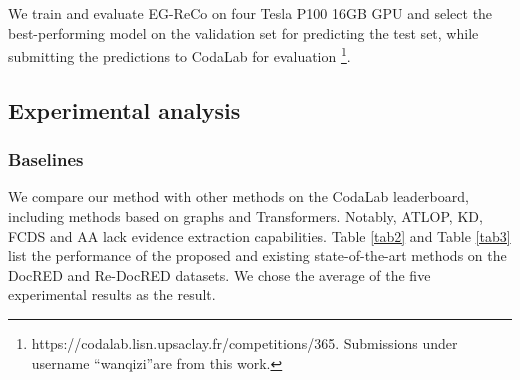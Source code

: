 \documentclass[preprint,12pt]{elsarticle}
\begin{document}
We train and evaluate EG-ReCo on four Tesla P100 16GB GPU and select the best-performing model on the validation set for predicting the test set, while submitting the predictions to CodaLab for evaluation \footnote{https://codalab.lisn.upsaclay.fr/competitions/365. Submissions under username “wanqizi”are from this work.}.

\subsection{Experimental analysis}\label{subsec4}
\subsubsection{Baselines}\label{subsubsec9}
We compare our method with other methods on the CodaLab leaderboard, including methods based on graphs and Transformers. Notably, ATLOP, KD, FCDS and AA lack evidence extraction capabilities. Table \ref{tab2} and Table \ref{tab3} list the performance of the proposed and existing state-of-the-art methods on the DocRED and Re-DocRED datasets. We chose the average of the five experimental results as the result.

\begin{table}[h]
\centering
\caption{Statistics of Re-DocRED and DocRED.}\label{tab1}
\end{table}
\end{document}
